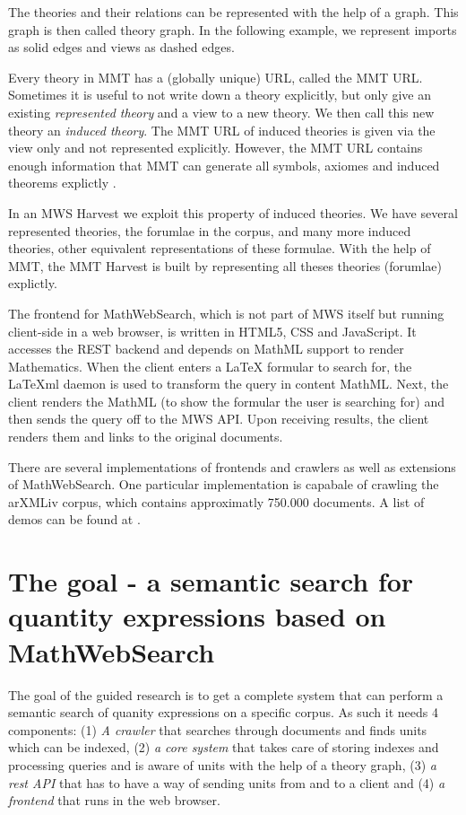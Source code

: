 \documentclass[11pt]{article}
\begin{document}
The theories and their relations can be represented with the help of a graph. This graph is then called theory graph. In the following example, we represent imports as solid edges and views as dashed edges. 

Every theory in MMT has a (globally unique) URL, called the MMT URL. Sometimes it is useful to not write down a theory explicitly, but only give an existing \textit{represented theory} and a view to a new theory. We then call this new theory an \textit{induced theory}. The MMT URL of induced theories is given via the view only and not represented explicitly. However, the MMT URL contains enough information that MMT can generate all symbols, axiomes and induced theorems explictly \cite{IanKohProd:rassmk14}.

In an MWS Harvest we exploit this property of induced theories. We have several represented theories, the forumlae in the corpus, and many more induced theories, other equivalent representations of these formulae. With the help of MMT, the MMT Harvest is built by representing all theses theories (forumlae) explictly.

The frontend for MathWebSearch, which is not part of MWS itself but running client-side in a web browser, is written in HTML5, CSS and JavaScript. It accesses the REST backend and depends on MathML support to render Mathematics. When the client enters a \LaTeX{} formular to search for, the \LaTeX{}ml daemon \cite{latexml-daemon} is used to transform the query in content MathML. Next, the client renders the MathML (to show the formular the user is searching for) and then sends the query off to the MWS API. Upon receiving results, the client renders them and links to the original documents.

There are several implementations of frontends and crawlers as well as extensions of MathWebSearch. One particular implementation is capabale of crawling the arXMLiv corpus, which contains approximatly 750.000 documents. A list of demos can be found at \cite{URL:MWSDemo}.

\section{The goal - a semantic search for quantity expressions based on MathWebSearch}
\label{sec:extension}

The goal of the guided research is to get a complete system that can perform a semantic search of quanity expressions on a specific corpus.  As such it needs 4 components: (1) \textit{A crawler} that searches through documents and finds units which can be indexed, (2) \textit{a core system} that takes care of storing indexes and processing queries and is aware of units with the help of a theory graph, (3) \textit{a rest API} that has to have a way of sending units from and to a client and (4) \textit{a frontend} that runs in the web browser.
\end{document}
